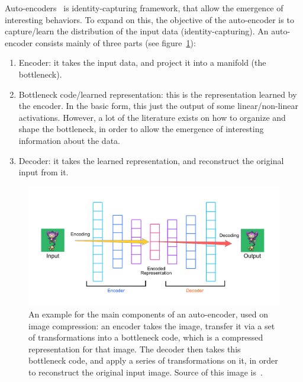   \par Auto-encoders~\citep{hinton2006reducing} is identity-capturing framework, that allow the emergence of interesting behaviors. To expand on this, the objective of the auto-encoder is to capture/learn the distribution of the input data (identity-capturing). An auto-encoder consists mainly of three parts (see figure~\ref{fig:autoenc}):
  \begin{enumerate}
    \item Encoder: it takes the input data, and project it into a manifold (the bottleneck).
    \item Bottleneck code/learned representation: this is the representation learned by the encoder. In the basic form, this just the output of some linear/non-linear activations. However, a lot of the literature exists on how to organize and shape the bottleneck, in order to allow the emergence of interesting information about the data.
    \item Decoder: it takes the learned representation, and reconstruct the original input from it.
  \end{enumerate}

  \begin{figure}
    \centering
    \includegraphics[scale=0.4]{images/framework/autoencoder.png}
    \caption{An example for the main components of an auto-encoder, used on image compression: an encoder takes the image, transfer it via a set of transformations into a bottleneck code, which is a compressed representation for that image. The decoder then takes this bottleneck code, and apply a series of transformations on it, in order to reconstruct the original input image. Source of this image is~\citep{autoencsimage}.}
    \label{fig:autoenc}
  \end{figure}



